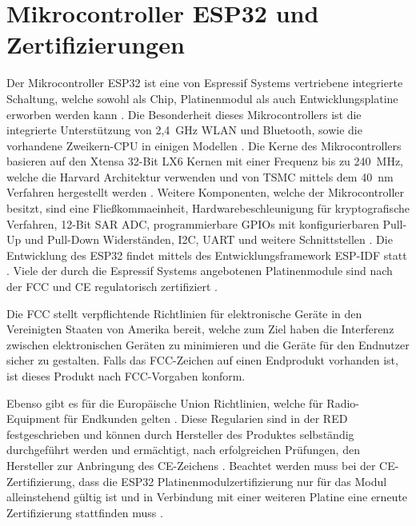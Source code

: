 
\section{Mikrocontroller ESP32 und Zertifizierungen}
\label{section:esp32Explained}

Der Mikrocontroller ESP32 ist eine von Espressif Systems vertriebene integrierte Schaltung, welche sowohl als Chip, Platinenmodul als auch Entwicklungsplatine erworben werden kann \cites{espressifModules}{espressifDevKit}{espressifSoC}. Die Besonderheit dieses Mikrocontrollers ist die integrierte Unterstützung von 2,4~GHz \acs{WLAN} und Bluetooth, sowie die vorhandene Zweikern-\acs{CPU} in einigen Modellen \cites{espressifGetStarted}[S.~8]{espressifTechnicalReference}[S.~24]{espressifTechnicalReference}. Die Kerne des Mikrocontrollers basieren auf den Xtensa 32-Bit LX6 Kernen mit einer Frequenz bis zu 240~MHz, welche die Harvard Architektur verwenden und von TSMC mittels dem 40~nm Verfahren hergestellt werden \cites{espressifGetStarted}[S.~9]{espressifTechnicalReference}[S.~8]{espressifTechnicalReference}[S.~24]{espressifTechnicalReference}. Weitere Komponenten, welche der Mikrocontroller besitzt, sind eine Fließkommaeinheit, Hardwarebeschleunigung für kryptografische Verfahren, 12-Bit \ac{SAR} \ac{ADC}, programmierbare \acfp{GPIO} mit konfigurierbaren Pull-Up und Pull-Down Widerständen, \ac{I2C}, \ac{UART} und weitere Schnittstellen \cites[S.~10f.]{espressifTechnicalReference}[S.~23]{espressifTechnicalReference}[S.~34]{espressifTechnicalReference}. Die Entwicklung des ESP32 findet mittels des Entwicklungsframework \ac{ESP-IDF} statt \cites{espressifGetStarted}{espressifIDF}. Viele der durch die Espressif Systems angebotenen Platinenmodule sind nach der \ac{FCC} \cite{fccApproval} und \ac{CE} regulatorisch zertifiziert \cite{espressifCertificates}.

Die \ac{FCC} stellt verpflichtende Richtlinien für elektronische Geräte in den Vereinigten Staaten von Amerika bereit, welche zum Ziel haben die Interferenz zwischen elektronischen Geräten zu minimieren und die Geräte für den Endnutzer sicher zu gestalten. Falls das \ac{FCC}-Zeichen auf einen Endprodukt vorhanden ist, ist dieses Produkt nach \ac{FCC}-Vorgaben konform. \cite{fccApproval}

Ebenso gibt es für die Europäische Union Richtlinien, welche für Radio-Equipment für Endkunden gelten \cites{europeanCEMarking}{europeanRED}. Diese Regularien sind in der \ac{RED} festgeschrieben und können durch Hersteller des Produktes selbständig durchgeführt werden und ermächtigt, nach erfolgreichen Prüfungen, den Hersteller zur Anbringung des \ac{CE}-Zeichens \cite[S.~14]{europeanFunkanalagen}. Beachtet werden muss bei der \ac{CE}-Zertifizierung, dass die ESP32 Platinenmodulzertifizierung nur für das Modul alleinstehend gültig ist und in Verbindung mit einer weiteren Platine eine erneute Zertifizierung stattfinden muss \cite{naumannCE}.

